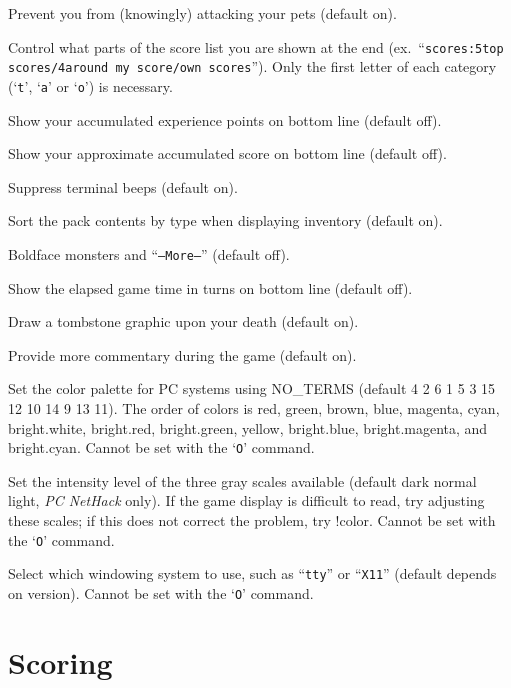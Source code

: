 \item[\ib{safe\_pet}]
Prevent you from (knowingly) attacking your pets (default on).
\item[\ib{scores}]
Control what parts of the score list you are shown at the end (ex.\
``{\tt scores:5top scores/4around my score/own scores}'').  Only the first
letter of each category (`{\tt t}', `{\tt a}' or `{\tt o}') is necessary.
\item[\ib{showexp}]
Show your accumulated experience points on bottom line (default off).
\item[\ib{showscore}]
Show your approximate accumulated score on bottom line (default off).
\item[\ib{silent}]
Suppress terminal beeps (default on).
\item[\ib{sortpack}]
Sort the pack contents by type when displaying inventory (default on).
\item[\ib{standout}]
Boldface monsters and ``{\tt --More--}'' (default off).
\item[\ib{time}]
Show the elapsed game time in turns on bottom line (default off).
\item[\ib{tombstone}]
Draw a tombstone graphic upon your death (default on).
\item[\ib{verbose}]
Provide more commentary during the game (default on).
\item[\ib{videocolors}]
Set the color palette for PC systems using NO\_TERMS
(default 4 2 6 1 5 3 15 12 10 14 9 13 11).
The order of colors is red, green, brown, blue, magenta, cyan,
bright.white, bright.red, bright.green, yellow, bright.blue,
bright.magenta, and bright.cyan.
Cannot be set with the `{\tt O}' command.
\item[\ib{videoshades}]
Set the intensity level of the three gray scales available
(default dark normal light, {\it PC\/ NetHack\/} only).
If the game display is difficult to read, try adjusting these scales;
if this does not correct the problem, try !color.
Cannot be set with the `{\tt O}' command.
\item[\ib{windowtype}]
Select which windowing system to use, such as ``{\tt tty}'' or ``{\tt X11}''
(default depends on version).
Cannot be set with the `{\tt O}' command.
\elist

\section{Scoring}

